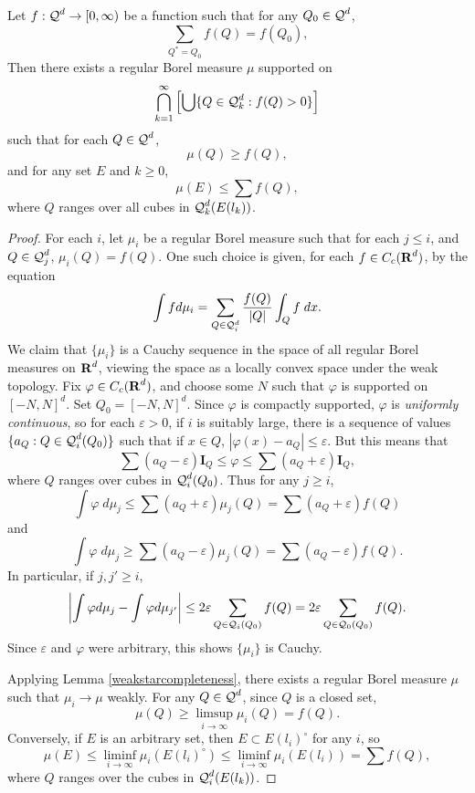 \begin{lemma} \label{massdistributionprinciplelem}
	Let $f: \operatorname{\mathcal{Q}}^d \to [0,\infty)$ be a function such that for any $Q_0 \in \operatorname{\mathcal{Q}}^d$,
	\begin{equation} \label{equation73234091} \sum_{Q^* = Q_0} f(Q) = f(Q_0), \end{equation}
	Then there exists a regular Borel measure $\mu$ supported on
	\[ \bigcap_{k = 1}^\infty \left[ \bigcup \{ Q \in \operatorname{\mathcal{Q}}_k^d : f(Q) > 0 \} \right] \]
	such that for each $Q \in \operatorname{\mathcal{Q}}^d$,
	\begin{equation} \label{massdissupperbound} \mu(Q) \geq f(Q), \end{equation}
	and for any set $E$ and $k \geq 0$,
	\begin{equation} \label{massdisslowerbound} \mu(E) \leq \sum f(Q), \end{equation}
	where $Q$ ranges over all cubes in $\operatorname{\mathcal{Q}}^d_k(E(l_k))$.
\end{lemma}
\begin{proof}
	For each $i$, let $\mu_i$ be a regular Borel measure such that for each $j \leq i$, and $Q \in \operatorname{\mathcal{Q}}_j^d$, $\mu_i(Q) = f(Q)$. One such choice is given, for each $f \in C_c(\operatorname{\mathbf{R}}^d)$, by the equation
	\[ \int f d\mu_i = \sum_{Q \in \operatorname{\mathcal{Q}}_i^d} \frac{f(Q)}{|Q|} \int_Q f\; dx. \]
	We claim that $\{ \mu_i \}$ is a Cauchy sequence in the space of all regular Borel measures on $\operatorname{\mathbf{R}}^d$, viewing the space as a locally convex space under the weak topology. Fix $\varphi \in C_c(\operatorname{\mathbf{R}}^d)$, and choose some $N$ such that $\varphi$ is supported on $[-N,N]^d$. Set $Q_0 = [-N,N]^d$. Since $\varphi$ is compactly supported, $\varphi$ is \emph{uniformly continuous}, so for each $\varepsilon > 0$, if $i$ is suitably large, there is a sequence of values $\{ a_Q : Q \in \operatorname{\mathcal{Q}}_i^d(Q_0) \}$ such that if $x \in Q$, $|\varphi(x) - a_Q| \leq \varepsilon$. But this means that
	\[ \sum (a_Q - \varepsilon) \mathbf{I}_Q \leq \varphi \leq \sum (a_Q + \varepsilon) \mathbf{I}_Q, \]
	where $Q$ ranges over cubes in $\operatorname{\mathcal{Q}}_i^d(Q_0)$. Thus for any $j \geq i$,
	\[ \int \varphi\; d\mu_j\leq \sum (a_Q + \varepsilon) \mu_j(Q) = \sum (a_Q + \varepsilon) f(Q) \]
	and
	\[ \int \varphi\; d\mu_j \geq \sum (a_Q - \varepsilon) \mu_j(Q) = \sum (a_Q - \varepsilon) f(Q). \]
	In particular, if $j,j' \geq i$,
	\[ \left| \int \varphi d\mu_j - \int \varphi d\mu_{j'} \right| \leq 2 \varepsilon \sum_{Q \in \operatorname{\mathcal{Q}}_i(Q_0)} f(Q) = 2\varepsilon \sum_{Q \in \operatorname{\mathcal{Q}}_0(Q_0)} f(Q). \]
	Since $\varepsilon$ and $\varphi$ were arbitrary, this shows $\{ \mu_i \}$ is Cauchy.

	Applying Lemma \ref{weakstarcompleteness}, there exists a regular Borel measure $\mu$ such that $\mu_i \to \mu$ weakly. For any $Q \in \operatorname{\mathcal{Q}}^d$, since $Q$ is a closed set,
	\[ \mu(Q) \geq \limsup_{i \to \infty} \mu_i(Q) = f(Q). \]
	Conversely, if $E$ is an arbitrary set, then $E \subset E(l_i)^\circ$ for any $i$, so
	\[ \mu(E) \leq \liminf_{i \to \infty} \mu_i(E(l_i)^\circ) \leq \liminf_{i \to \infty} \mu_i(E(l_i)) = \sum f(Q), \]
	where $Q$ ranges over the cubes in $\operatorname{\mathcal{Q}}_i^d(E(l_k))$.
\end{proof}

